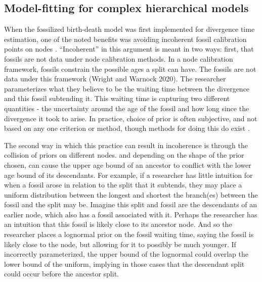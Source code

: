 \documentclass{article}
\begin{document}
\subsection{Model-fitting for complex hierarchical models}

When the fossilized birth-death model was first implemented for divergence time estimation, one of the noted benefits was avoiding incoherent fossil calibration points on nodes \citep{Heath2014}.
``Incoherent'' in this argument is meant in two ways: first, that fossils are not data under node calibration methods.
In a node calibration framework, fossils constrain the possible ages a split can have.
The fossils are not data under this framework (Wright and Warnock 2020). 
The researcher parameterizes what they believe to be the waiting time between the divergence and this fossil subtending it. 
This waiting time is capturing two different quantities - the uncertainty around the age of the fossil and how long since the divergence it took to arise.
In practice, choice of prior is often subjective, and not based on any one criterion or method, though methods for doing this do exist \citep{Nowak2013}.

The second way in which this practice can result in incoherence is through the collision of priors on different nodes.
and depending on the shape of the prior chosen, can cause the upper age bound of an ancestor to conflict with the lower age bound of its descendants. 
For example, if a researcher has little intuition for when a fossil arose in relation to the split that it subtends, they may place a uniform distribution between the longest and shortest the branch(es) between the fossil and the split may be.
Imagine this split and fossil are the descendants of an earlier node, which also has a fossil associated with it. 
Perhaps the researcher has an intuition that this fossil is likely close to its ancestor node. 
And so the researcher places a lognormal prior on the fossil waiting time, saying the fossil is likely close to the node, but allowing for it to possibly be much younger. 
If incorrectly parameterized, the upper bound of the lognormal could overlap the lower bound of the uniform, implying in those cases that the descendant split could occur before the ancestor split.
\end{document}
